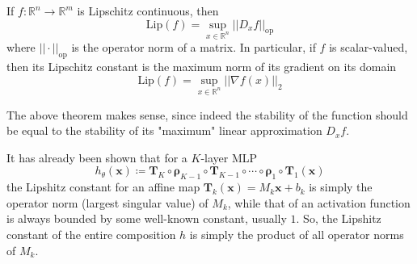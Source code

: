 \documentclass{article}
\begin{document}
  \begin{theorem}
    If $f: \mathbb{R}^n \longrightarrow \mathbb{R}^m$ is Lipschitz continuous, then 
    \begin{equation}
      \mathrm{Lip}(f) = \sup_{x \in \mathbb{R}^n} ||D_x f||_{\mathrm{op}}
    \end{equation}
    where $||\cdot ||_{\mathrm{op}}$ is the operator norm of a matrix. In particular, if $f$ is scalar-valued, then its Lipschitz constant is the maximum norm of its gradient on its domain 
    \begin{equation}
      \mathrm{Lip}(f) = \sup_{x \in \mathbb{R}^n} ||\nabla f(x)||_2
    \end{equation}
  \end{theorem}

  The above theorem makes sense, since indeed the stability of the function should be equal to the stability of its "maximum" linear approximation $D_x f$. 

  \begin{theorem}
    It has already been shown that for a $K$-layer MLP
    \begin{equation}
      h_\theta (\mathbf{x}) \coloneqq \mathbf{T}_K \circ \boldsymbol{\rho}_{K-1} \circ \mathbf{T}_{K-1} \circ \cdots \circ \boldsymbol{\rho}_1 \circ \mathbf{T}_1 (\mathbf{x})
    \end{equation}
    the Lipshitz constant for an affine map $\mathbf{T}_k (\mathbf{x}) = M_k \mathbf{x} + b_k$ is simply the operator norm (largest singular value) of $M_k$, while that of an activation function is always bounded by some well-known constant, usually $1$. So, the Lipshitz constant of the entire composition $h$ is simply the product of all operator norms of $M_k$. 
  \end{theorem}
\end{document}

